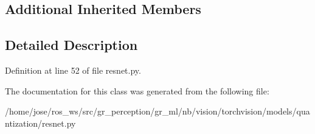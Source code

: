 \subsection*{Additional Inherited Members}


\subsection{Detailed Description}


Definition at line 52 of file resnet.\+py.



The documentation for this class was generated from the following file\+:\begin{DoxyCompactItemize}
\item 
/home/jose/ros\+\_\+ws/src/gr\+\_\+perception/gr\+\_\+ml/nb/vision/torchvision/models/quantization/resnet.\+py\end{DoxyCompactItemize}
